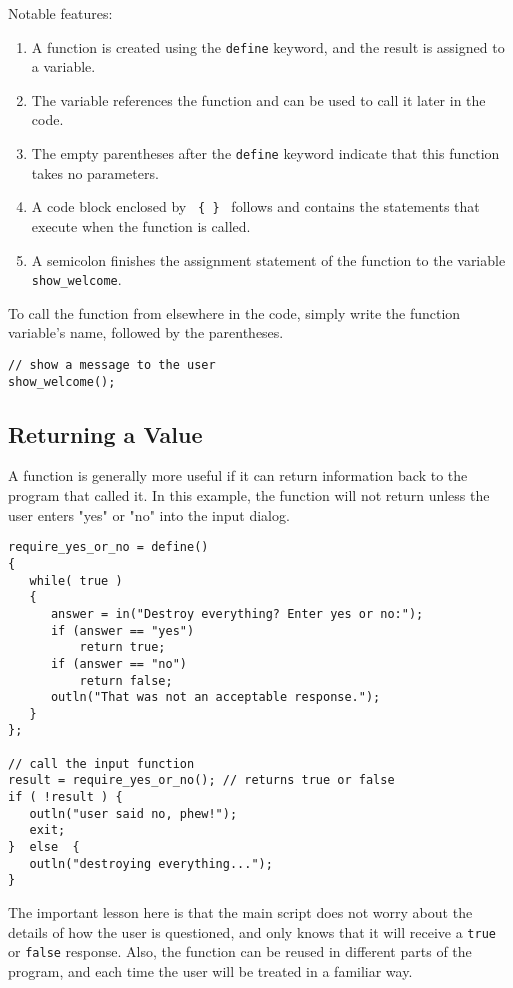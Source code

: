 \documentclass{article}
\begin{document}
Notable features:
\begin{enumerate}
\item A function is created using the \texttt{define} keyword, and the result is assigned to a variable.
\item The variable references the function and can be used to call it later in the code.
\item The empty parentheses after the \texttt{define} keyword indicate that this function takes no parameters.
\item A code block enclosed by \texttt{ \{ \} } follows and contains the statements that execute when the function is called.
\item A semicolon finishes the assignment statement of the function to the variable \texttt{show\_welcome}.
\end{enumerate}

To call the function from elsewhere in the code, simply write the function variable's name, followed by the parentheses.  

\begin{verbatim}
// show a message to the user
show_welcome();
\end{verbatim}

\subsection{Returning a Value}

A function is generally more useful if it can return information back to the program that called it.  In this example, the function will not return unless the user enters "yes" or "no" into the input dialog.

\begin{verbatim}
require_yes_or_no = define()
{
   while( true )
   {
      answer = in("Destroy everything? Enter yes or no:");
      if (answer == "yes")
          return true;
      if (answer == "no")
          return false;
      outln("That was not an acceptable response.");
   }
};

// call the input function
result = require_yes_or_no(); // returns true or false
if ( !result ) {
   outln("user said no, phew!");
   exit;
}  else  {
   outln("destroying everything...");
}
\end{verbatim}

The important lesson here is that the main script does not worry about the details of how the user is questioned, and only knows that it will receive a \texttt{true} or \texttt{false} response.  Also, the function can be reused in different parts of the program, and each time the user will be treated in a familiar way.
\end{document}
